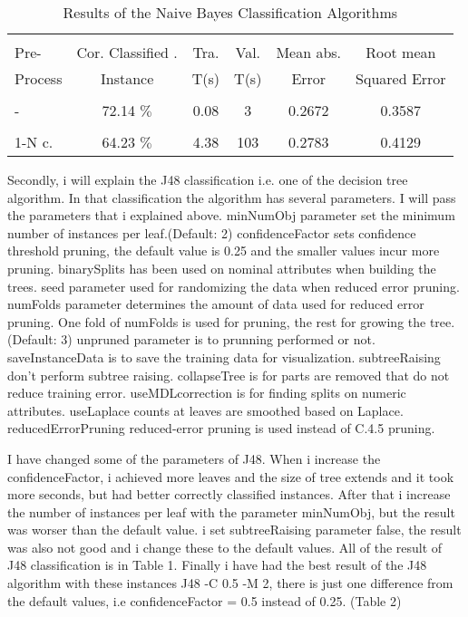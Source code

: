 \documentclass[a4paper]{article}
\begin{document}
\begin{table}
\begin{tabular}{|l| c | c | c |c |c |}

\hline & & & & & \\
Pre- & Cor. Classified . & Tra. & Val. & Mean abs.  & Root mean \\
Process & Instance & T(s) &  T(s) & Error & Squared Error \\
\hline & & & & & \\
- &72.14  $\%$ & 0.08 & 3 &  0.2672 & 0.3587 \\ 
\hline & & & & & \\
1-N c. &64.23  $\%$ & 4.38 & 103 & 0.2783 & 0.4129 \\ 
\hline
\end{tabular}
\caption{Results of the Naive Bayes Classification Algorithms}
\end{table}

Secondly, i will explain the J48 classification i.e. one of the decision tree algorithm. In that classification the algorithm has several parameters. I will pass the parameters that i explained above. minNumObj parameter set the minimum number of instances per leaf.(Default: 2) confidenceFactor sets confidence threshold pruning, the default value is 0.25 and the smaller values incur more pruning. binarySplits has been used on nominal attributes when building the trees. seed parameter used for randomizing the data when reduced error pruning. numFolds parameter determines the amount of data used for reduced error pruning.  One fold of numFolds is used for pruning, the rest for growing the tree. (Default: 3) unpruned parameter is to prunning performed or not. saveInstanceData is to save the training data for visualization. subtreeRaising don't perform subtree raising. collapseTree is for parts are removed that do not reduce training error. useMDLcorrection is for finding splits on numeric attributes. useLaplace counts at leaves are smoothed based on Laplace. reducedErrorPruning reduced-error pruning is used instead of C.4.5 pruning. 

I have changed some of the parameters of J48. When i increase the confidenceFactor, i achieved more leaves and the size of tree extends and it took more seconds, but had better correctly classified instances. After that i increase the number of instances per leaf with the parameter minNumObj, but the result was worser than the default value. i set subtreeRaising parameter false, the result was also not good and i change these to the default values. All of the result of J48 classification is in Table 1. Finally i have had the best result of the J48 algorithm with these instances J48 -C 0.5 -M 2, there is just one difference from the default values, i.e confidenceFactor = 0.5 instead of 0.25. (Table 2) 
\end{document}
